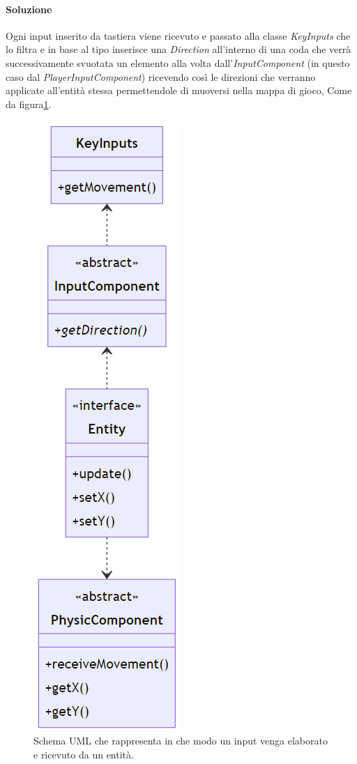 \documentclass[a4paper,12pt]{report}
\begin{document}
\paragraph{Soluzione}
    Ogni input inserito da tastiera viene ricevuto e passato alla classe \emph{KeyInputs} che lo filtra e in base al tipo  
    inserisce una \emph{Direction} all'interno di una coda che verrà successivamente svuotata un elemento alla volta 
    dall'\emph{InputComponent} (in questo caso dal \emph{PlayerInputComponent}) ricevendo così le direzioni che verranno 
    applicate all'entità stessa permettendole di muoversi nella mappa di gioco, Come da figura\ref{img:PlayerMovement}.
\begin{figure}[H]
\centering{}
\includegraphics[scale = 0.5]{img/PlayerMovement.PNG}
\caption{Schema UML che rappresenta in che modo un input venga elaborato e ricevuto da un entità.}
\label{img:PlayerMovement}
\end{figure}
\end{document}
